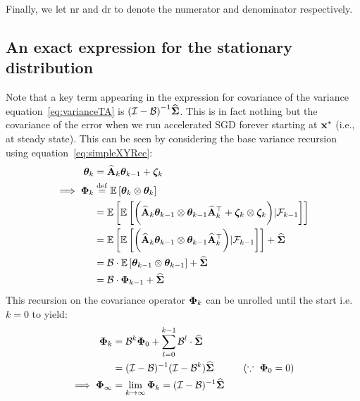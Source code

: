 Finally, we let $\text{nr}$ and $\text{dr}$ to denote the numerator and denominator respectively.

\subsection{An exact expression for the stationary distribution}
Note that a key term appearing in the expression for covariance of the variance equation~\eqref{eq:varianceTA} is ${\left(\mathcal{I} - \mathcal{B}\right)}^{-1}\widehat{\boldsymbol{\Sigma}}$. This is in fact nothing but the covariance of the error when we run accelerated SGD forever starting at $\mathbf{x}^*$ (i.e., at steady state). This can be seen by
considering the base variance recursion using equation~\eqref{eq:simpleXYRec}:
\begin{align*}
\boldsymbol{\theta}_{k}&=\widehat{\mathbf{A}}_{k}\boldsymbol{\theta}_{k-1}+\boldsymbol{\zeta}_k\nonumber\\
\implies \boldsymbol{\Phi}_k&\stackrel{\mathrm{def}}{=}\mathbb{E}\left[\boldsymbol{\theta}_k\otimes\boldsymbol{\theta}_k\right]\nonumber\\
&=\mathbb{E}\left[\mathbb{E}\left[\bigg(\widehat{\mathbf{A}}_{k}\boldsymbol{\theta}_{k-1}\otimes\boldsymbol{\theta}_{k-1}\widehat{\mathbf{A}}_{k}^{\top}+\boldsymbol{\zeta}_k\otimes\boldsymbol{\zeta}_k\bigg)|\mathcal{F}_{k-1}\right]\right]\nonumber\\
&=\mathbb{E}\left[\mathbb{E}\left[\bigg(\widehat{\mathbf{A}}_{k}\boldsymbol{\theta}_{k-1}\otimes\boldsymbol{\theta}_{k-1}\widehat{\mathbf{A}}_{k}^{\top}\bigg)|\mathcal{F}_{k-1}\right]\right]+\mathbf{\widehat{\Sigma}}\nonumber\\
&=\mathcal{B}\cdot\mathbb{E}\left[\boldsymbol{\theta}_{k-1}\otimes\boldsymbol{\theta}_{k-1}\right]+\mathbf{\widehat{\Sigma}}\nonumber\\
&=\mathcal{B}\cdot\boldsymbol{\Phi}_{k-1}+\mathbf{\widehat{\Sigma}}
\end{align*}
This recursion on the covariance operator $\boldsymbol{\Phi}_{k}$ can be unrolled until the start i.e. $k=0$ to yield:
\begin{align}
\label{eq:steadyStateExp}
\phiv_k&=\BT^k\phiv_0 + \sum_{l=0}^{k-1} \BT^l\cdot\Sigh\nonumber\\
&=(\eyeT-\BT)^{-1}(\eyeT-\BT^{k})\Sigh\quad\quad\quad(\because\ \phiv_0=0)\nonumber\\
\implies\phiv_{\infty}&=\lim_{k\to\infty}\phiv_k=(\eyeT-\BT)^{-1}\Sigh
\end{align}

\iffalse
At this point, we will state the following lemma that presents a sharp bound on the steady state covariance of $\y-\xs$, i.e. $\E{(\y_{\infty}-\xs)\otimes(\y_{\infty}-\xs)}$:
\begin{lemma}
The Covariance of the steady state parameters of $\y_{\infty}-\xs$, i.e. $\E{(\y_{\infty}-\xs)\otimes(\y_{\infty}-\xs)}$ is upper bounded by:
\begin{align*}
\U_{22}\defeq\E{(\y_{\infty}-\xs)\otimes(\y_{\infty}-\xs)}=
\end{align*}
\end{lemma}
\fi

